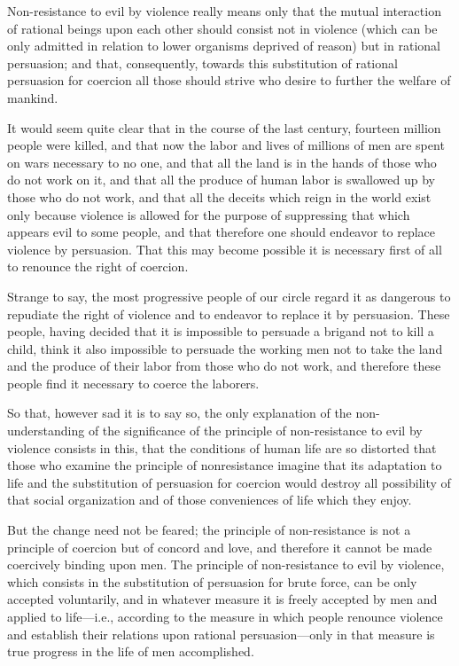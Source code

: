 \documentclass{book}
\begin{document}
Non-resistance to evil by violence really means only that the mutual interaction of rational beings upon each other should consist not in violence (which can be only admitted in relation to lower organisms deprived of reason) but in rational persuasion; and that, consequently, towards this substitution of rational persuasion for coercion all those should strive who desire to further the welfare of mankind.

It would seem quite clear that in the course of the last century, fourteen million people were killed, and that now the labor and lives of millions of men are spent on wars necessary to no one, and that all the land is in the hands of those who do not work on it, and that all the produce of human labor is swallowed up by those who do not work, and that all the deceits which reign in the world exist only because violence is allowed for the purpose of suppressing that which appears evil to some people, and that therefore one should endeavor to replace violence by persuasion. That this may become possible it is necessary first of all to renounce the right of coercion.

Strange to say, the most progressive people of our circle regard it as dangerous to repudiate the right of violence and to endeavor to replace it by persuasion. These people, having decided that it is impossible to persuade a brigand not to kill a child, think it also impossible to persuade the working men not to take the land and the produce of their labor from those who do not work, and therefore these people find it necessary to coerce the laborers.

So that, however sad it is to say so, the only explanation of the non-understanding of the significance of the principle of non-resistance to evil by violence consists in this, that the conditions of human life are so distorted that those who examine the principle of nonresistance imagine that its adaptation to life and the substitution of persuasion for coercion would destroy all possibility of that social organization and of those conveniences of life which they enjoy.

But the change need not be feared; the principle of non-resistance is not a principle of coercion but of concord and love, and therefore it cannot be made coercively binding upon men. The principle of non-resistance to evil by violence, which consists in the substitution of persuasion for brute force, can be only accepted voluntarily, and in whatever measure it is freely accepted by men and applied to life—i.e., according to the measure in which people renounce violence and establish their relations upon rational persuasion—only in that measure is true progress in the life of men accomplished.
\end{document}
